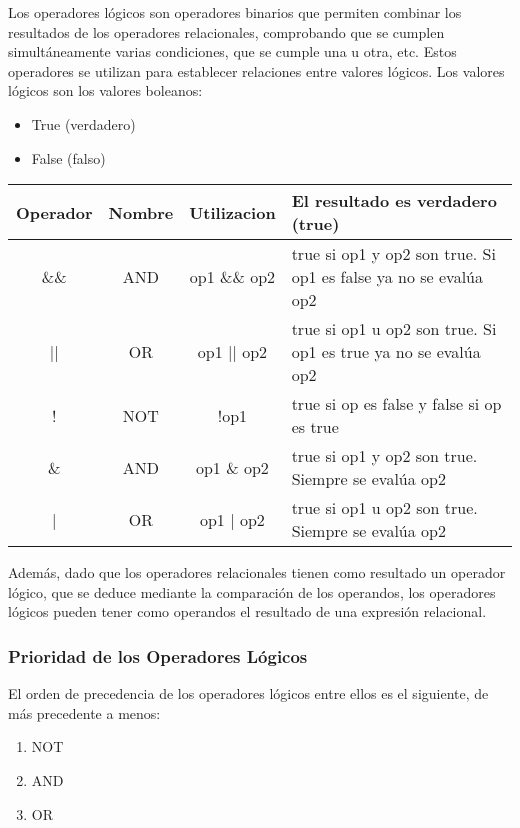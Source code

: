 Los operadores lógicos son operadores binarios que permiten combinar los resultados de los
operadores relacionales, comprobando que se cumplen simultáneamente varias condiciones,
que se cumple una u otra, etc. Estos operadores se utilizan para establecer relaciones entre valores lógicos. Los valores lógicos son los valores boleanos: 

\begin{itemize}
	\item True (verdadero)
	\item False (falso)
\end{itemize}

\begin{tabular}{|c|c|c|p{9cm}|}
	\hline
	\textbf{Operador}	& \textbf{Nombre} & \textbf{Utilizacion} & \textbf{El resultado es verdadero (true)} \\
	\hline
     \&\& & AND & op1 \&\& op2 & true si op1 y op2 son true. Si op1 es false ya no se evalúa op2 \\
	\hline
	 || & OR & op1 || op2 & true si op1 u op2 son true. Si op1 es true ya no se evalúa op2 \\
	\hline
	 ! & NOT & !op1 & true si op es false y false si op es true \\
	\hline
	 \& & AND & op1 \& op2 & true si op1 y op2 son true. Siempre se evalúa op2 \\
	\hline
	| & OR & op1 | op2 & true si op1 u op2 son true. Siempre se evalúa op2 \\
	\hline
\end{tabular}

Además, dado que los operadores relacionales tienen como resultado un operador lógico, que se deduce mediante la comparación de los operandos, los operadores lógicos pueden tener como operandos el resultado de una expresión relacional.

\subsubsection{Prioridad de los Operadores Lógicos } 

El orden de precedencia de los operadores lógicos entre ellos es el siguiente, de más precedente a menos: 

\begin{enumerate}
	\item NOT
	\item AND
	\item OR
\end{enumerate}